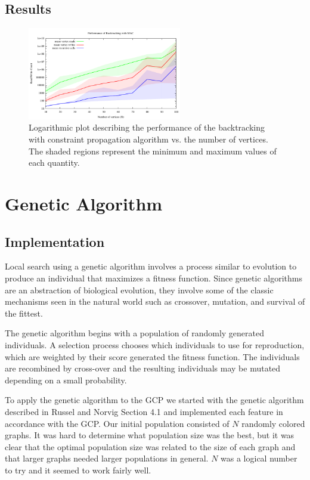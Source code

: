 \documentclass{article}
\begin{document}
	\subsection{Results}
	
		\begin{figure}[h!]
			\centering
			\includegraphics[width=0.6\textwidth]{../results_5/backtracking_mac/bt_mac_performance}
			\caption{Logarithmic plot describing the performance of the backtracking with constraint propagation algorithm vs. the number of vertices. The shaded regions represent the minimum and maximum values of each quantity.}
		\end{figure}
	
\section{Genetic Algorithm}

	\subsection{Implementation}
	Local search using a genetic algorithm involves a process similar to evolution to produce an individual that maximizes a fitness function. Since genetic algorithms are an abstraction of biological evolution, they involve some of the classic mechanisms seen in the natural world such as crossover, mutation, and survival of the fittest\cite{genetic}.
	
	The genetic algorithm begins with a population of randomly generated individuals. A selection process chooses which individuals to use for reproduction, which are weighted by their score generated the fitness function. The individuals are recombined by cross-over and the resulting individuals may be mutated depending on a small probability.
	
	To apply the genetic algorithm to the GCP we started with the genetic algorithm described in Russel and Norvig Section 4.1\cite{ai} and implemented each feature in accordance with the GCP. Our initial population consisted of $N$ randomly colored graphs. It was hard to determine what population size was the best, but it was clear that the optimal population size was related to the size of each graph and that larger graphs needed larger populations in general. $N$ was a logical number to try and it seemed to work fairly well.
	
\end{document}
